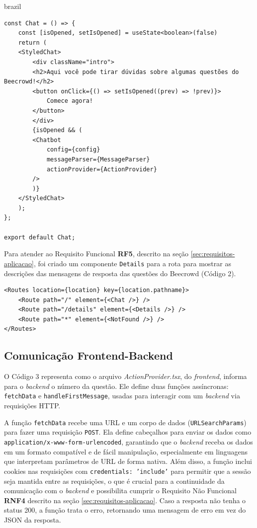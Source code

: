 \begin{otherlanguage*}{brazil}
\begin{lstlisting}[style=ufscthesisx_style, caption={Componente Chat}]
const Chat = () => {
    const [isOpened, setIsOpened] = useState<boolean>(false)
    return (
    <StyledChat>
        <div className="intro">
        <h2>Aqui você pode tirar dúvidas sobre algumas questões do Beecrowd!</h2>
        <button onClick={() => setIsOpened((prev) => !prev)}>
            Comece agora!
        </button>
        </div>
        {isOpened && (
        <Chatbot
            config={config}
            messageParser={MessageParser}
            actionProvider={ActionProvider}
        />
        )}
    </StyledChat>
    );
};

export default Chat;    
\end{lstlisting}

Para atender ao Requisito Funcional \textbf{RF5}, descrito na seção \ref{sec:requisitos-aplicacao}, foi criado um componente \texttt{Details} para a rota  para mostrar as descrições das mensagens de resposta das questões do Beecrowd (Código 2).

\begin{lstlisting}[style=ufscthesisx_style, caption={Rotas do frontend}]
<Routes location={location} key={location.pathname}>
    <Route path="/" element={<Chat />} />
    <Route path="/details" element={<Details />} />
    <Route path="*" element={<NotFound />} />
</Routes>
\end{lstlisting}

\subsection{Comunicação Frontend-Backend}

O Código 3 representa como o arquivo \textit{ActionProvider.tsx}, do \textit{frontend}, informa para o \textit{backend} o número da questão. Ele define duas funções assíncronas: \texttt{fetchData} e \texttt{handleFirstMessage}, usadas para interagir com um \textit{backend} via requisições HTTP. 

A função \texttt{fetchData} recebe uma URL e um corpo de dados (\texttt{URLSearchParams}) para fazer uma requisição \texttt{POST}. Ela define cabeçalhos para enviar os dados como \texttt{application/x-www-form-urlencoded}, garantindo que o \textit{backend} receba os dados em um formato compatível e de fácil manipulação, especialmente em linguagens que interpretam parâmetros de URL de forma nativa. Além disso, a função inclui cookies nas requisições com \texttt{credentials: 'include'} para permitir que a sessão seja mantida entre as requisições, o que é crucial para a continuidade da comunicação com o \textit{backend} e possibilita cumprir o Requisito Não Funcional \textbf{RNF4} descrito na seção \ref{sec:requisitos-aplicacao}. Caso a resposta não tenha o status 200, a função trata o erro, retornando uma mensagem de erro em vez do JSON da resposta. 


\end{otherlanguage*}
